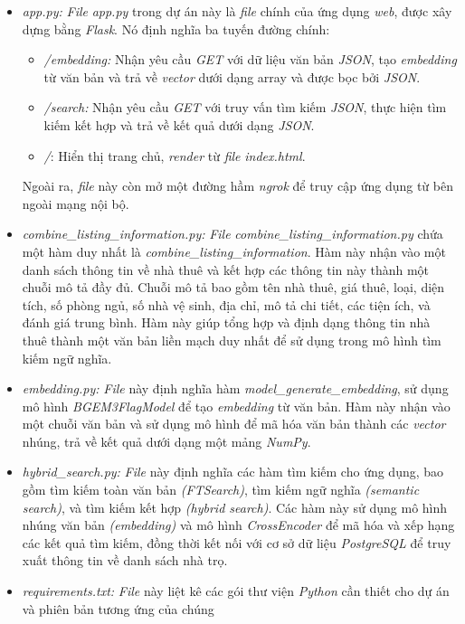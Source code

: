 \begin{itemize}
    \item \textit{app.py:} \textit{File} \textit{app.py} trong dự án này là \textit{file} chính của ứng dụng \textit{web}, được xây dựng bằng \textit{Flask}. Nó định nghĩa ba tuyến đường chính: 
    \begin{itemize}
        \item \textit{/embedding:} Nhận yêu cầu \textit{GET} với dữ liệu văn bản \textit{JSON}, tạo \textit{embedding} từ văn bản và trả về \textit{vector} dưới dạng array và được bọc bởi \textit{JSON}.
        \item \textit{/search:} Nhận yêu cầu \textit{GET} với truy vấn tìm kiếm \textit{JSON}, thực hiện tìm kiếm kết hợp và trả về kết quả dưới dạng \textit{JSON}.
        \item \textit{/}: Hiển thị trang chủ, \textit{render} từ \textit{file} \textit{index.html}.
    \end{itemize}
    Ngoài ra, \textit{file} này còn mở một đường hầm \textit{ngrok} để truy cập ứng dụng từ bên ngoài mạng nội bộ.
    \item \textit{combine\_listing\_information.py:} \textit{File} \textit{combine\_listing\_information.py} chứa một hàm duy nhất là \textit{combine\_listing\_information}. Hàm này nhận vào một danh sách thông tin về nhà thuê và kết hợp các thông tin này thành một chuỗi mô tả đầy đủ. Chuỗi mô tả bao gồm tên nhà thuê, giá thuê, loại, diện tích, số phòng ngủ, số nhà vệ sinh, địa chỉ, mô tả chi tiết, các tiện ích, và đánh giá trung bình. Hàm này giúp tổng hợp và định dạng thông tin nhà thuê thành một văn bản liền mạch duy nhất để sử dụng trong mô hình tìm kiếm ngữ nghĩa.
    \item \textit{embedding.py:} \textit{File} này định nghĩa hàm \textit{model\_generate\_embedding}, sử dụng mô hình \textit{BGEM3FlagModel} để tạo \textit{embedding} từ văn bản. Hàm này nhận vào một chuỗi văn bản và sử dụng mô hình để mã hóa văn bản thành các \textit{vector} nhúng, trả về kết quả dưới dạng một mảng \textit{NumPy}.
    \item \textit{hybrid\_search.py:} \textit{File} này định nghĩa các hàm tìm kiếm cho ứng dụng, bao gồm tìm kiếm toàn văn bản \textit{(FTSearch)}, tìm kiếm ngữ nghĩa \textit{(semantic search)}, và tìm kiếm kết hợp \textit{(hybrid search)}. Các hàm này sử dụng mô hình nhúng văn bản \textit{(embedding)} và mô hình \textit{CrossEncoder} để mã hóa và xếp hạng các kết quả tìm kiếm, đồng thời kết nối với cơ sở dữ liệu \textit{PostgreSQL} để truy xuất thông tin về danh sách nhà trọ.
    \item \textit{requirements.txt:} \textit{File} này liệt kê các gói thư viện \textit{Python} cần thiết cho dự án và phiên bản tương ứng của chúng
\end{itemize}
